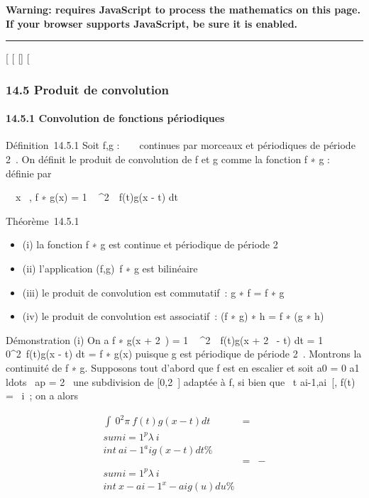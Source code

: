 \textbf{Warning: 
requires JavaScript to process the mathematics on this page.\\ If your
browser supports JavaScript, be sure it is enabled.}

\begin{center}\rule{3in}{0.4pt}\end{center}

{[}
{[}
{[}{]}
{[}

\subsubsection{14.5 Produit de convolution}

\paragraph{14.5.1 Convolution de fonctions périodiques}

Définition~14.5.1 Soit f,g : ~ \rightarrow~  continues par morceaux et périodiques
de période 2\pi~. On définit le produit de convolution de f et g comme la
fonction f ∗ g : ~ \rightarrow~  définie par

\forall~~x \in {}~, f ∗ g(x) = 1 \pi~ ^2\pi~~f(t)g(x - t) dt

Théorème~14.5.1

\begin{itemize}
\itemsep1pt\parskip0pt
\item
  (i) la fonction f ∗ g est continue et périodique de période 2\pi~
\item
  (ii) l'application (f,g)\mapsto~f ∗ g est
  bilinéaire
\item
  (iii) le produit de convolution est commutatif~: g ∗ f = f ∗ g
\item
  (iv) le produit de convolution est associatif~: (f ∗ g) ∗ h = f ∗ (g ∗
  h)
\end{itemize}

Démonstration (i) On a f ∗ g(x + 2\pi~) = 1 \pi~
^2\pi~~f(t)g(x + 2\pi~ - t) dt
= 1 \pi~ \int ~
0^2\pi~f(t)g(x - t) dt = f ∗ g(x) puisque g est périodique
de période 2\pi~. Montrons la continuité de f ∗ g. Supposons tout d'abord
que f est en escalier et soit a0 = 0 \leq a1
\leq\\ldots~ \leq
ap = 2\pi~ une subdivision de {[}0,2\pi~{]} adaptée à f, si bien que
\forall~t \in{]}ai-1,ai~{[}, f(t) =
\lambda~i~; on a alors

\begin{align*} \int ~
0^2\pi~f(t)g(x - t) dt& =& \\sum
i=1^p\lambda~ i
\\int  ~
ai-1^ai g(x - t) dt \%&
\\ & =& -\\sum
i=1^p\lambda~ i
\\int  ~
x-ai-1^x-ai g(u) du\%&
\\ \end{align*}


